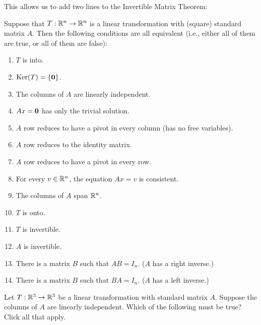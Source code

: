 This allows us to add two lines to the Invertible Matrix Theorem: 

{}  
Suppose that $T: \mathbb R^n \rightarrow \mathbb R^n$ is a linear transformation
with (square) standard matrix $A$.  Then the following conditions are all equivalent (i.e., either all of
them are true, or all of them are false):

\begin{enumerate}
\item $T$ is into.
\item $\mathrm{Ker}(T) = \{ \mathbf{0} \}$.  
\item The columns of $A$ are linearly independent. 
\item $Ax = \mathbf{0}$ has only the trivial solution.
\item $A$ row reduces to have a pivot in every column (has no free variables).  
\item $A$ row reduces to the identity matrix.  
\item $A$ row reduces to have a pivot in every row.  
\item For every $v\in \mathbb R^n$, the equation $Ax = v$ is consistent.
\item The columns of $A$ span $\mathbb R^n$.  
\item $T$ is onto.  
\item $T$ is invertible.
\item $A$ is invertible.
\item There is a matrix $B$ such that $AB = I_n$.  ($A$ has a right inverse.)
\item There is a matrix $B$ such that $BA = I_n$.  ($A$ has a left inverse.)  

\end{enumerate}



\endedxtext



Let $T: \mathbb R^3 \rightarrow \mathbb R^3$ be a linear transformation with standard matrix $A$.  Suppose the columns of $A$ are linearly
independent.  Which of the following must be true?  Click all that apply.  



\edXsolution{
}

\endedxproblem


\endedxvertical